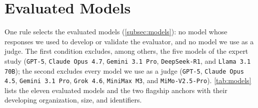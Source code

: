 \section{Evaluated Models}
\label{appendix:models}

One rule selects the evaluated models (\autoref{subsec:models}): no model whose responses we used to
develop or validate the evaluator, and no model we use as a judge.
The first condition excludes, among others, the five models of the expert study (\texttt{GPT-5},
\texttt{Claude Opus 4.7}, \texttt{Gemini 3.1 Pro}, \texttt{DeepSeek-R1}, and
\texttt{Llama 3.1 70B}); the second excludes every model we use as a judge (\texttt{GPT-5},
\texttt{Claude Opus 4.5}, \texttt{Gemini 3.1 Pro}, \texttt{Grok 4.6}, \texttt{MiniMax M3}, and
\texttt{MiMo-V2.5-Pro}).
\autoref{tab:models} lists the eleven evaluated models and the two flagship anchors with their
developing organization, size, and identifiers.

